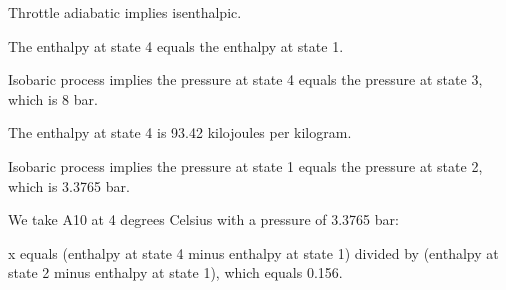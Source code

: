 Throttle adiabatic implies isenthalpic.

The enthalpy at state 4 equals the enthalpy at state 1.

Isobaric process implies the pressure at state 4 equals the pressure at state 3, which is 8 bar.

The enthalpy at state 4 is 93.42 kilojoules per kilogram.

Isobaric process implies the pressure at state 1 equals the pressure at state 2, which is 3.3765 bar.

We take A10 at 4 degrees Celsius with a pressure of 3.3765 bar:

x equals (enthalpy at state 4 minus enthalpy at state 1) divided by (enthalpy at state 2 minus enthalpy at state 1), which equals 0.156.